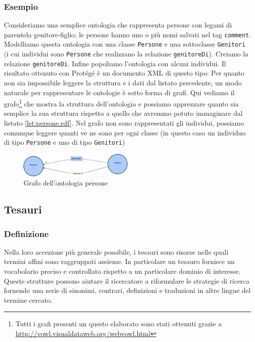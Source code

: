 \subsubsection{Esempio}
Consideriamo una semplice ontologia che rappresenta persone con legami di parentela genitore-figlio; le persone hanno uno o più nomi salvati nel tag \verb|comment|. Modelliamo questa ontologia con una classe \verb|Persone| e una sottoclasse \verb|Genitori| (i cui individui sono \verb|Persone| che realizzano la relazione \verb|genitoreDi|). Creiamo la relazione \verb|genitoreDi|. Infine popoliamo l'ontologia con alcuni individui. Il risultato ottenuto con Protégé è un documento XML di questo tipo:
Per quanto non sia impossibile leggere la struttura e i dati dal listato precedente, un modo naturale per rappresentare le ontologie è sotto forma di grafi. Qui vediamo il grafo\footnote{Tutti i grafi presenti un questo elaborato sono stati ottenuti grazie a \url{http://vowl.visualdataweb.org/webvowl.html}} che mostra la struttura dell'ontologia e possiamo apprezzare quanto sia semplice la sua struttura rispetto a quello che avremmo potuto immaginare dal listato \ref{lst:persone.rdf}. Nel grafo non sono rappresentati gli individui, possiamo comunque leggere quanti ve ne sono per ogni classe (in questo caso un individuo di tipo \verb|Persone| e uno di tipo \verb|Genitori|)
\begin{figure}[H]
	\centering
	\includegraphics[width=0.5\textwidth]{Picture/persone.rdf.pdf}
	\caption{Grafo dell'ontologia persone}
\end{figure}


\subsection{Tesauri}
\subsubsection{Definizione}
Nella loro accezione più generale possibile, i tesauri sono risorse nelle quali termini affini sono raggruppati assieme\cite{kilgarriff2000s}. In particolare un tesauro fornisce un vocabolario preciso e controllato rispetto a un particolare dominio di interesse.\cite{srinivasan1992thesaurus} Queste strutture possono aiutare il ricercatore a riformulare le strategie di ricerca fornendo una serie di sinonimi, contrari, definizioni e traduzioni in altre lingue del termine cercato.

